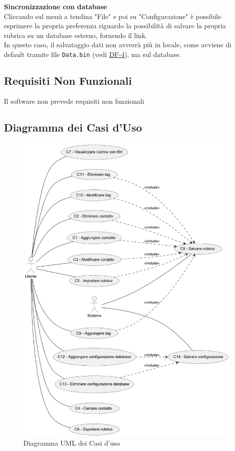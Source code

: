 \begin{tcolorbox}[colback=white,colframe=black!80!white,title=\textbf{Interfacce con sistemi esterni IS}]
	\begin{itemize}[itemsep=2pt, topsep=0pt]
		\hypertarget{IS-1}{\item[\textbf{IS-1}]} \textbf{Sincronizzazione con database}
		\\Cliccando sul menù a tendina "File" e poi su "Configurazione" è possibile esprimere la propria preferenza riguardo la possibilità di salvare la propria rubrica su un database esterno, fornendo il link. 
		\\In questo caso, il salvataggio dati non avverrà più in locale, come avviene di default tramite file \texttt{Data.bin} (vedi \hyperlink{DF-4}{DF-4}), ma sul database.
	\end{itemize}
\end{tcolorbox}


\subsection{Requisiti Non Funzionali}
Il software non prevede requisiti non funzionali


\newpage
\subsection{Diagramma dei Casi d'Uso}
\begin{figure}[h]
	\centering
	\includegraphics[width=.77\linewidth]{images/DiagrammaCasiD.png}
	\caption{Diagramma UML dei Casi d'uso}
	\label{diagramma_casi_duso1}	
\end{figure}

